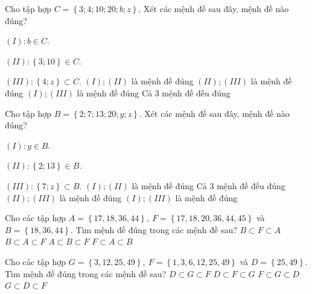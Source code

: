 \begin{ex}
 Cho tập hợp $C=\left\{3;4;10;20;b;z\right\}$. Xét các mệnh đề sau đây, mệnh đề nào đúng?

$(I):b\in C$.

$(II):\left\{3;10\right\}\in C$.

$(III):\left\{4;z\right\}\subset C$. 
\choice
{ $(I);(II)$ là mệnh đề đúng }
   { $(II);(III)$ là mệnh đề đúng }
     { \True $(I);(III)$ là mệnh đề đúng }
    { Cả 3 mệnh đề đều đúng }
\end{ex}

\begin{ex}
 Cho tập hợp $B=\left\{2;7;13;20;y;z\right\}$. Xét các mệnh đề sau đây, mệnh đề nào đúng?

$(I):y\in B$.

$(II):\left\{2;13\right\}\in B$.

$(III):\left\{7;z\right\}\subset B$. 
\choice
{ $(I);(II)$ là mệnh đề đúng }
   { Cả 3 mệnh đề đều đúng }
     { $(II);(III)$ là mệnh đề đúng }
    { \True $(I);(III)$ là mệnh đề đúng }
\end{ex}

\begin{ex}
 Cho các tập hợp $A=\left\{17, 18, 36, 44\right\},\ F=\left\{17, 18, 20, 36, 44, 45\right\}$ và $B=\left\{18, 36, 44\right\}$. Tìm mệnh đề đúng trong các mệnh đề sau? 
\choice
{ $B\subset F\subset A$ }
   { \True $B\subset A\subset F$ }
     { $A\subset B\subset F$ }
    { $F\subset A\subset B$ }
\end{ex}

\begin{ex}
 Cho các tập hợp $G=\left\{3, 12, 25, 49\right\},\ F=\left\{1, 3, 6, 12, 25, 49\right\}$ và $D=\left\{25, 49\right\}$. Tìm mệnh đề đúng trong các mệnh đề sau? 
\choice
{ \True $D\subset G\subset F$ }
   { $D\subset F\subset G$ }
     { $F\subset G\subset D$ }
    { $G\subset D\subset F$ }
\end{ex}

